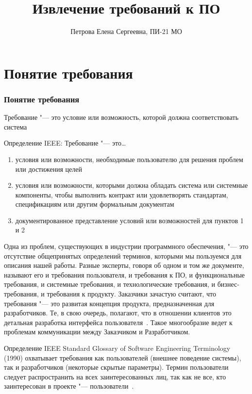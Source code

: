 \documentclass{../industrial-development}
\title{Извлечение требований к ПО}
\author{Петрова Елена Сергеевна, ПИ-21 МО}
\date{}
\begin{document}
\begin{frame}
  \titlepage
\end{frame}

\section{Понятие требования}
\begin{frame} \frametitle{Понятие требования}
  \begin{block}{}
   \alert{Требование} "--- это условие или возможность, которой должна соответствовать система
  \end{block}
  Определение IEEE:  \alert{Требование} "--- это\dots
	 \begin{enumerate}
\item условия или возможности, необходимые пользователю для решения проблем или достижения целей
\item условия или возможности, которыми должна обладать система или системные компоненты, чтобы выполнить контракт или
удовлетворять стандартам, спецификациям или другим формальным документам
\item документированное представление условий или возможностей для пунктов 1 и 2
  \end{enumerate}
\end{frame}

\lecturenotes

Одна из проблем, существующих в индустрии программного обеспечения, "--- это отсутствие общепринятых определений терминов, которыми мы пользуемся для описания нашей работы. Разные эксперты, говоря об одном и том же документе, называют его и требования пользователя, и требования к ПО, и функциональные требования, и системные требования, и технологические требования, и бизнес-требования, и требования к продукту. Заказчики зачастую считают, что требования "--- это развитая концепция продукта, предназначенная для разработчиков. Те, в свою очередь, полагают, что в отношении клиентов это детальная разработка интерфейса пользователя~\cite[с.~6]{Wiegers}. Такое многообразие ведет к проблемам коммуникации между Заказчиком и Разработчиком.

Определение IEEE Standard Glossary
of Software Engineering Terminology (1990) охватывает требования как пользователей (внешнее поведение системы), так и разработчиков (некоторые скрытые параметры). Термин пользователи следует распространить на всех заинтересованных лиц, так как не все, кто заинтересован в проекте "--- пользователи~\cite[с.~7]{Wiegers}. 
\end{document}
